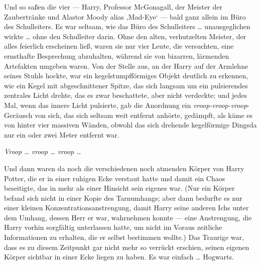 Und so saßen die vier — Harry, Professor McGonagall, der Meister der Zaubertränke und Alastor Moody alias ‚Mad-Eye‘ — bald ganz allein im Büro des Schulleiters. Es war seltsam, wie das Büro des Schulleiters … unausgeglichen wirkte … ohne den Schulleiter darin. Ohne den alten, verhutzelten Meister, der alles feierlich erscheinen ließ, waren sie nur vier Leute, die versuchten, eine ernsthafte Besprechung abzuhalten, während sie von bizarren, lärmenden Artefakten umgeben waren. Von der Stelle aus, an der Harry auf der Armlehne seines Stuhls hockte, war ein kegelstumpfförmiges Objekt deutlich zu erkennen, wie ein Kegel mit abgeschnittener Spitze, das sich langsam um ein pulsierendes zentrales Licht drehte, das es zwar beschattete, aber nicht verdeckte; und jedes Mal, wenn das innere Licht pulsierte, gab die Anordnung ein \emph{vroop-vroop-vroop}-Geräusch von sich, das sich seltsam weit entfernt anhörte, gedämpft, als käme es von hinter vier massiven Wänden, obwohl das sich drehende kegelförmige Dingsda nur ein oder zwei Meter entfernt war.

\emph{Vroop … vroop … vroop …}

Und dann waren da noch die verschiedenen noch atmenden Körper von Harry Potter, die er in einer ruhigen Ecke verstaut hatte und damit ein Chaos beseitigte, das in mehr als einer Hinsicht sein eigenes war. (Nur ein Körper befand sich nicht in einer Kopie des Tarnumhangs; aber dann bedurfte es nur einer kleinen Konzentrationsanstrengung, damit Harry seine anderen Ichs unter dem Umhang, dessen Herr er war, wahrnehmen konnte — eine Anstrengung, die Harry vorhin sorgfältig unterlassen hatte, um nicht im Voraus zeitliche Informationen zu erhalten, die er selbst bestimmen wollte.) Das Traurige war, dass es zu diesem Zeitpunkt gar nicht mehr so verrückt erschien, seinen eigenen Körper sichtbar in einer Ecke liegen zu haben. Es war einfach … Hogwarts.

